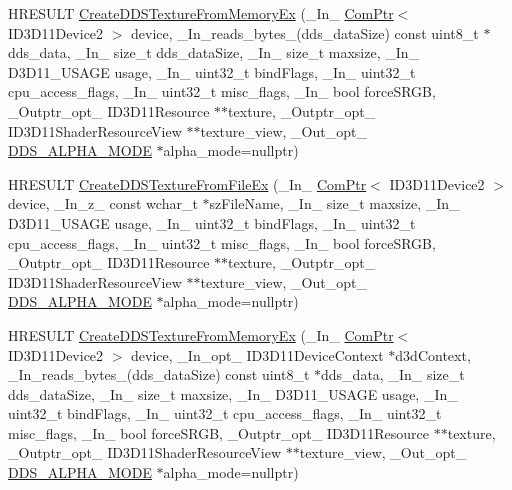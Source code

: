 \begin{DoxyCompactItemize}
\item 
H\+R\+E\+S\+U\+LT \hyperlink{namespacemage_a722f410006184b6dbc8267a309432be4}{Create\+D\+D\+S\+Texture\+From\+Memory\+Ex} (\+\_\+\+In\+\_\+ \hyperlink{namespacemage_ae74f374780900893caa5555d1031fd79}{Com\+Ptr}$<$ I\+D3\+D11\+Device2 $>$ device, \+\_\+\+In\+\_\+reads\+\_\+bytes\+\_\+(dds\+\_\+data\+Size) const uint8\+\_\+t $\ast$dds\+\_\+data, \+\_\+\+In\+\_\+ size\+\_\+t dds\+\_\+data\+Size, \+\_\+\+In\+\_\+ size\+\_\+t maxsize, \+\_\+\+In\+\_\+ D3\+D11\+\_\+\+U\+S\+A\+GE usage, \+\_\+\+In\+\_\+ uint32\+\_\+t bind\+Flags, \+\_\+\+In\+\_\+ uint32\+\_\+t cpu\+\_\+access\+\_\+flags, \+\_\+\+In\+\_\+ uint32\+\_\+t misc\+\_\+flags, \+\_\+\+In\+\_\+ bool force\+S\+R\+GB, \+\_\+\+Outptr\+\_\+opt\+\_\+ I\+D3\+D11\+Resource $\ast$$\ast$texture, \+\_\+\+Outptr\+\_\+opt\+\_\+ I\+D3\+D11\+Shader\+Resource\+View $\ast$$\ast$texture\+\_\+view, \+\_\+\+Out\+\_\+opt\+\_\+ \hyperlink{namespacemage_a0c586a2bad862f4858900ca121ca80c2}{D\+D\+S\+\_\+\+A\+L\+P\+H\+A\+\_\+\+M\+O\+DE} $\ast$alpha\+\_\+mode=nullptr)
\item 
H\+R\+E\+S\+U\+LT \hyperlink{namespacemage_af416c510d74455dca0d9608f079685a7}{Create\+D\+D\+S\+Texture\+From\+File\+Ex} (\+\_\+\+In\+\_\+ \hyperlink{namespacemage_ae74f374780900893caa5555d1031fd79}{Com\+Ptr}$<$ I\+D3\+D11\+Device2 $>$ device, \+\_\+\+In\+\_\+z\+\_\+ const wchar\+\_\+t $\ast$sz\+File\+Name, \+\_\+\+In\+\_\+ size\+\_\+t maxsize, \+\_\+\+In\+\_\+ D3\+D11\+\_\+\+U\+S\+A\+GE usage, \+\_\+\+In\+\_\+ uint32\+\_\+t bind\+Flags, \+\_\+\+In\+\_\+ uint32\+\_\+t cpu\+\_\+access\+\_\+flags, \+\_\+\+In\+\_\+ uint32\+\_\+t misc\+\_\+flags, \+\_\+\+In\+\_\+ bool force\+S\+R\+GB, \+\_\+\+Outptr\+\_\+opt\+\_\+ I\+D3\+D11\+Resource $\ast$$\ast$texture, \+\_\+\+Outptr\+\_\+opt\+\_\+ I\+D3\+D11\+Shader\+Resource\+View $\ast$$\ast$texture\+\_\+view, \+\_\+\+Out\+\_\+opt\+\_\+ \hyperlink{namespacemage_a0c586a2bad862f4858900ca121ca80c2}{D\+D\+S\+\_\+\+A\+L\+P\+H\+A\+\_\+\+M\+O\+DE} $\ast$alpha\+\_\+mode=nullptr)
\item 
H\+R\+E\+S\+U\+LT \hyperlink{namespacemage_ad9f3edfa9ac87c7273ba0e5eab893e5a}{Create\+D\+D\+S\+Texture\+From\+Memory\+Ex} (\+\_\+\+In\+\_\+ \hyperlink{namespacemage_ae74f374780900893caa5555d1031fd79}{Com\+Ptr}$<$ I\+D3\+D11\+Device2 $>$ device, \+\_\+\+In\+\_\+opt\+\_\+ I\+D3\+D11\+Device\+Context $\ast$d3d\+Context, \+\_\+\+In\+\_\+reads\+\_\+bytes\+\_\+(dds\+\_\+data\+Size) const uint8\+\_\+t $\ast$dds\+\_\+data, \+\_\+\+In\+\_\+ size\+\_\+t dds\+\_\+data\+Size, \+\_\+\+In\+\_\+ size\+\_\+t maxsize, \+\_\+\+In\+\_\+ D3\+D11\+\_\+\+U\+S\+A\+GE usage, \+\_\+\+In\+\_\+ uint32\+\_\+t bind\+Flags, \+\_\+\+In\+\_\+ uint32\+\_\+t cpu\+\_\+access\+\_\+flags, \+\_\+\+In\+\_\+ uint32\+\_\+t misc\+\_\+flags, \+\_\+\+In\+\_\+ bool force\+S\+R\+GB, \+\_\+\+Outptr\+\_\+opt\+\_\+ I\+D3\+D11\+Resource $\ast$$\ast$texture, \+\_\+\+Outptr\+\_\+opt\+\_\+ I\+D3\+D11\+Shader\+Resource\+View $\ast$$\ast$texture\+\_\+view, \+\_\+\+Out\+\_\+opt\+\_\+ \hyperlink{namespacemage_a0c586a2bad862f4858900ca121ca80c2}{D\+D\+S\+\_\+\+A\+L\+P\+H\+A\+\_\+\+M\+O\+DE} $\ast$alpha\+\_\+mode=nullptr)

\end{DoxyCompactItemize}
